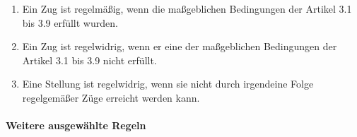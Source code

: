 \documentclass[
  a4paper,
  justified,
  nobib,
]{tufte-handout}
\begin{document}
\begin{enumerate}[{3}.1]
  \begin{enumerate}[{3.10}.1]
    \item Ein Zug ist regelmäßig, wenn die maßgeblichen Bedingungen der Artikel 3.1 bis
      3.9 erfüllt wurden.
    \item Ein Zug ist regelwidrig, wenn er eine der maßgeblichen Bedingungen der Artikel
      3.1 bis 3.9 nicht erfüllt.
    \item Eine Stellung ist regelwidrig, wenn sie nicht durch irgendeine Folge
      regelgemäßer Züge erreicht werden kann.
  \end{enumerate}
\end{enumerate}

\paragraph{Weitere ausgewählte Regeln}%
\label{par:weitere_ausgewahlte_regeln}
\end{document}
